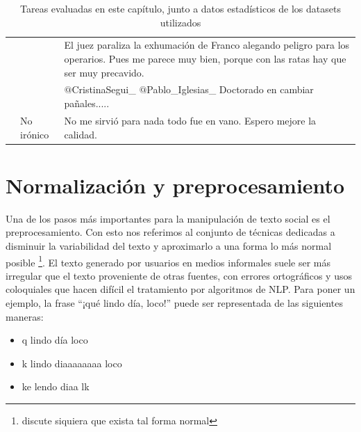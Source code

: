 \begin{table}
\begin{tabularx}{\textwidth}{l l X}
                                       &                & El juez paraliza la exhumación de Franco alegando peligro para los operarios. Pues me parece muy bien, porque con las ratas hay que ser muy precavido.	\\
                                       &                & $@$CristinaSegui\_ $@$Pablo\_Iglesias\_ Doctorado en cambiar pañales.....	\\
                                       & No irónico     & No me sirvió para nada todo fue en vano. Espero mejore la calidad.	\\
        \hline
    \end{tabularx}
    \caption{Tareas evaluadas en este capítulo, junto a datos estadísticos de los datasets utilizados}
    \label{tab:03_datasets_examples}
\end{table}



\section{Normalización y preprocesamiento}
\label{sec:03_preprocessing}

Una de los pasos más importantes para la manipulación de texto social es el preprocesamiento. Con esto nos referimos al conjunto de técnicas dedicadas a disminuir la variabilidad del texto y aproximarlo a una forma lo más normal posible \footnote{\citet{eisenstein2013bad} discute siquiera que exista tal forma normal}. El texto generado por usuarios en medios informales suele ser más irregular que el texto proveniente de otras fuentes, con errores ortográficos y usos coloquiales que hacen difícil el tratamiento por algoritmos de NLP. Para poner un ejemplo, la frase ``¡qué lindo día, loco!'' puede ser representada de las siguientes maneras:

\begin{itemize}
    \item q lindo día loco
    \item k lindo diaaaaaaaa loco
    \item ke lendo diaa lk
\end{itemize}

